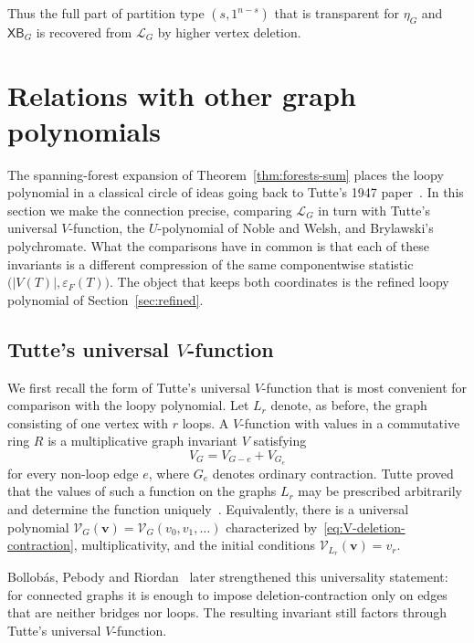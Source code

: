\documentclass[11pt]{article}
\theoremstyle{plain}
\theoremstyle{definition}
\renewcommand{\mathcal}{\mathscr}
\newcommand{\LL}{\mathcal{L}}    %
\newcommand{\cV}{\mathcal{V}}    %
\newcommand{\bv}{\mathbf{v}}
\newcommand{\XB}{\mathsf{XB}} %
\newcommand{\eps}{\varepsilon}
\numberwithin{equation}{section}
\begin{document}
Thus the full part of partition type $(s,1^{n-s})$ that is transparent for
$\eta_G$ and $\XB_G$ is recovered from $\LL_G$ by higher vertex deletion.



\section{Relations with other graph polynomials}\label{sec:relations}

The spanning-forest expansion of  Theorem~\ref{thm:forests-sum} places the
loopy polynomial in a classical circle of ideas going back to Tutte's 1947 paper~\cite{Tu1}.
In this section we make the connection precise, comparing $\LL_G$ in turn with Tutte's universal $V$-function, the $U$-polynomial
of Noble and Welsh, and Brylawski's polychromate.  What the comparisons have in common is that each of these invariants is a different compression of
the same componentwise statistic $\bigl(|V(T)|,\eps_F(T)\bigr)$.  The object
that keeps both coordinates is the refined loopy polynomial of Section~\ref{sec:refined}.

\subsection{Tutte's universal \texorpdfstring{$V$}{V}-function}\label{subsec:universal-V}

We first recall the form of Tutte's universal $V$-function that is most
convenient for comparison with the loopy polynomial.
Let $L_r$ denote, as before, the graph consisting of one vertex
with $r$ loops.  A $V$-function with values in a commutative ring $R$ is a multiplicative graph invariant
$V$ satisfying
\begin{equation}\label{eq:V-deletion-contraction}
   V_G=V_{G-e}+V_{G_e}
\end{equation}
for every non-loop edge $e$, where $G_e$ denotes ordinary contraction.
Tutte proved that the values of such a function on the graphs $L_r$ may be
prescribed arbitrarily and determine the function uniquely~\cite{Tu1}.
Equivalently, there is a universal polynomial
  $ \cV_G(\bv)=\cV_G(v_0,v_1,\ldots)$
characterized by~\eqref{eq:V-deletion-contraction}, multiplicativity, and the initial conditions
  $\cV_{L_r}(\bv)=v_r.$

Bollob\'as, Pebody and Riordan~\cite{BPR} later strengthened this universality
statement: for connected graphs it is enough to impose
deletion-contraction only on edges that are neither bridges nor loops.  The
resulting invariant still factors through Tutte's universal $V$-function.
\end{document}
